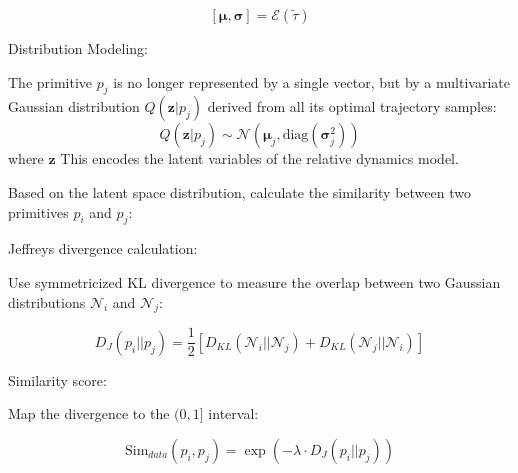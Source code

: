 \documentclass{article}
\begin{document}
$$[\boldsymbol{\mu}, \boldsymbol{\sigma}] = \mathcal{E}(\tilde{\tau})$$

Distribution Modeling:

The primitive $p_j$ is no longer represented by a single vector, but by a multivariate Gaussian distribution $Q(\mathbf{z}|p_j)$ derived from all its optimal trajectory samples: 
$$Q(\mathbf{z}|p_j) \sim \mathcal{N}(\boldsymbol{\mu}_j, \text{diag}(\boldsymbol{\sigma}_j^2))$$ where $\mathbf{z}$ This encodes the latent variables of the relative dynamics model.


Based on the latent space distribution, calculate the similarity between two primitives $p_i$ and $p_j$:

Jeffreys divergence calculation:

Use symmetricized KL divergence to measure the overlap between two Gaussian distributions $\mathcal{N}_i$ and $\mathcal{N}_j$:

$$D_{J}(p_i || p_j) = \frac{1}{2} \left[ D_{KL}(\mathcal{N}_i || \mathcal{N}_j) + D_{KL}(\mathcal{N}_j || \mathcal{N}_i) \right]$$

Similarity score:

Map the divergence to the $(0, 1]$ interval:

$$\text{Sim}_{data}(p_i, p_j) = \exp(-\lambda \cdot D_{J}(p_i || p_j))$$





\FloatBarrier
\end{document}
